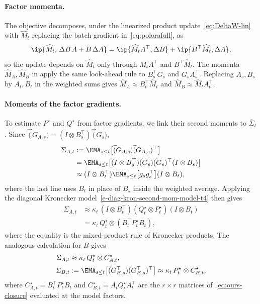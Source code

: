 \paragraph{Factor momenta.} The objective decomposes, under the linearized
product update~\eqref{eq:DeltaW-lin} with $\widehat M_t$ replacing the batch
gradient in~\eqref{eq:polorafull}, as
\[
  \ip{\widehat M_t,\,\Delta B\,A+B\,\Delta A}
  =\ip{\widehat M_tA^\top,\Delta B}+\ip{B^\top\widehat M_t,\Delta A},
\]
so the update depends on $\widehat M_t$ only through $\widehat M_tA^\top$
and $B^\top\widehat M_t$. The momenta $\widehat M_A,\widehat M_B$ in
 apply the same look-ahead rule to $B_s^\top G_s$ and
$G_sA_s^\top$. Replacing $A_s,B_s$ by $A_t,B_t$ in the weighted sums gives
$\widehat M_A\approx B_t^\top\widehat M_t$ and
$\widehat M_B\approx\widehat M_tA_t^\top$.

\paragraph{Moments of the factor gradients.} To estimate $P^\star$ and
$Q^\star$ from factor gradients, we link their second moments to $\overline{\Sigma}_t$.
Since
$\vec(G_{A,s})=(I\otimes B_s^\top)\vec(G_s)$,
\begin{align*}
 \Sigma_{A,t} &:=  \EMA_{s \leq t}\big[ \vec(G_{A,s})  \vec(G_{A,s})^\top\big]  \\
 &=  \EMA_{s \leq t}\big[ (I\otimes B_s^\top)\vec(G_s)\vec(G_s)^\top   (I\otimes B_s)\big]  \\
   &\approx  (I\otimes B_t^\top) \EMA_{s \leq t}\big[ g_s g_s^\top   \big]  (I\otimes B_t),
\end{align*}
where the last line uses $B_t$ in place of $B_s$ inside the weighted
average. Applying the diagonal Kronecker model~\eqref{e-diag-kron-second-mom-model-t4}
then gives
\begin{align*}
 \Sigma_{A,t}
   &\approx
   \kappa_t\,
   (I\otimes B_t^\top)
   (Q^\star_t\otimes P^\star_t)
   (I\otimes B_t) \\
   &= \kappa_t\,Q^\star_t\otimes(B_t^\top P^\star_tB_t),
\end{align*}
where the equality is the mixed-product rule of Kronecker products. The
analogous calculation for $B$ gives
\begin{align}
  \Sigma_{A,t}
    &\approx \kappa_t\,Q^\star_t\otimes C^\star_{A,t},
  \nonumber \\
  \Sigma_{B,t}
    &:=
      \EMA_{s \leq t}\big[
        \vec(G_{B,s}^\top)\vec(G_{B,s}^\top)^\top
      \big]
    \approx \kappa_t\,P^\star_t\otimes C^\star_{B,t},
  \label{eq:observable-moments-t4}
\end{align}
where $C^\star_{A,t}=B_t^\top P^\star_tB_t$ and
$C^\star_{B,t}=A_tQ^\star_tA_t^\top$ are the $r\times r$ matrices
of~\eqref{eq:ours-closure} evaluated at the model factors.

